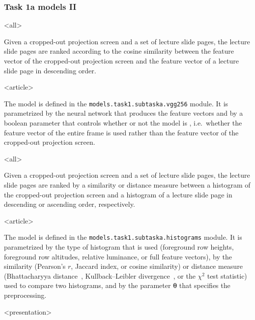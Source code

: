 \begin{frame}
\frametitle<presentation>{Task 1a models II}
\begin{description}[<+->]

\mode
<all>

  \item[\abbr{VGG}]
    Given a cropped-out projection screen and a set of lecture slide
    pages, the lecture slide pages are ranked according to the cosine
    similarity between the  feature vector of the cropped-out
    projection screen and the  feature vector of a lecture slide page
    in descending order.

\mode
<article>
    
    The model is defined in the
    \texttt{models.task1.subtaska.vgg256} module. It is parametrized by
    the neural network that produces the  feature vectors and by a
    boolean parameter that controls whether or not the model is
    , i.e.\ whether the  feature vector of the
    entire frame is used rather than the  feature vector of the
    cropped-out projection screen.

\mode
<all>

  \item[Histograms]
    Given a cropped-out projection screen and a set of lecture slide
    pages, the lecture slide pages are ranked by a similarity or distance
    measure between a histogram of the cropped-out projection screen and a
    histogram of a lecture slide page in descending or ascending order,
    respectively.

\mode
<article>

    The model is defined in the
    \texttt{models.task1.subtaska.histograms} module. It is parametrized by
    the type of histogram that is used (foreground row heights, foreground row
    altitudes, relative luminance, or full feature vectors), by the similarity
    (Pearson's $r$, Jaccard index, or cosine similarity) or distance measure
    (Bhattacharyya distance~\cite{bhattacharyya1943measure}, Kullback--Leibler
    divergence~\cite{kullback1951information}, or the $\chi^2$ test statistic)
    used to compare two histograms, and by the parameter $\bm\theta$ that
    specifies the preprocessing.

\mode
<presentation>

\end{description}
\end{frame}
